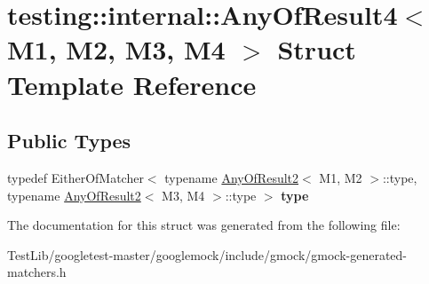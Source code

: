 \hypertarget{structtesting_1_1internal_1_1AnyOfResult4}{}\section{testing\+:\+:internal\+:\+:Any\+Of\+Result4$<$ M1, M2, M3, M4 $>$ Struct Template Reference}
\label{structtesting_1_1internal_1_1AnyOfResult4}
\subsection*{Public Types}
\begin{DoxyCompactItemize}
\item 
\mbox{\label{structtesting_1_1internal_1_1AnyOfResult4_a4f3c9aebb4f7fc24287b59a0bdf1a4a6}} 
typedef Either\+Of\+Matcher$<$ typename \hyperlink{structtesting_1_1internal_1_1AnyOfResult2}{Any\+Of\+Result2}$<$ M1, M2 $>$\+::type, typename \hyperlink{structtesting_1_1internal_1_1AnyOfResult2}{Any\+Of\+Result2}$<$ M3, M4 $>$\+::type $>$ {\bfseries type}
\end{DoxyCompactItemize}


The documentation for this struct was generated from the following file\+:\begin{DoxyCompactItemize}
\item 
Test\+Lib/googletest-\/master/googlemock/include/gmock/gmock-\/generated-\/matchers.\+h\end{DoxyCompactItemize}
